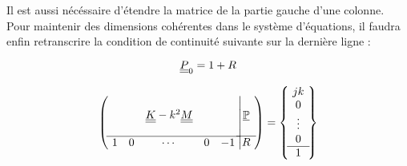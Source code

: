 Il est aussi nécéssaire d'étendre la matrice de la partie gauche d'une colonne. Pour maintenir des dimensions cohérentes
dans le système d'équations, il faudra enfin retranscrire la condition de continuité suivante sur la dernière ligne :

\begin{equation*}
	\underline{\underline{P}}_0 = 1 + R
\end{equation*}

\begin{equation}
	\left(~
	\begin{matrix}
		&&&&\\
	    & & \underline{\underline{K}} - k^2\underline{\underline{M}} & &\\&&&&\\\hline
		1 & 0 & \cdots & 0 & -1 \\
	\end{matrix}
	\right.
	\left|
	\begin{matrix}
		\\
		\underline{\mathbb{P}}\\\\\hline
		R
	\end{matrix}
	~\right) = 
	\left\{~
	\begin{matrix}
		jk\\
		0\\
		\vdots\\
		0\\\hline
		1
	\end{matrix}
	~\right\}
\end{equation}
